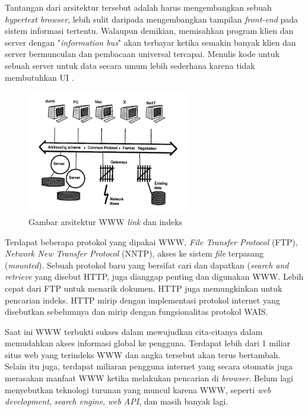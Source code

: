 Tantangan dari arsitektur tersebut adalah harus mengembangkan sebuah \textit{hypertext browser}, lebih sulit daripada mengembangkan tampilan \textit{front-end} pada sistem informasi tertentu. Walaupun demikian, memisahkan program klien dan server dengan "\textit{information bus}" akan terbayar ketika semakin banyak klien dan server bermunculan dan pembacaan universal tercapai. Menulis kode untuk sebuah server untuk data secara umum lebih sederhana karena tidak membutuhkan UI \citep{bernersLee1992}. 

\begin{figure}[H]
	\centering
	\includegraphics[keepaspectratio, width=7cm]{gambar/w3_architecture}
	\caption{Gambar arsitektur WWW \textit{link} dan indeks \citep{bernersLee1992}}
	\label{gambar:w3_architecture}
\end{figure}

Terdapat beberapa protokol yang dipakai WWW, \textit{File Transfer Protocol} (FTP), \textit{Network New Transfer Protocol} (NNTP), akses ke sistem \textit{file} terpasang (\textit{mounted}). Sebuah protokol baru yang bersifat cari dan dapatkan (\textit{search and retrieve} yang disebut HTTP, juga dianggap penting dan digunakan WWW. Lebih cepat dari FTP untuk menarik dokumen, HTTP juga memungkinkan untuk pencarian indeks. HTTP mirip dengan implementasi protokol internet yang disebutkan sebelumnya dan mirip dengan fungsionalitas protokol WAIS.

Saat ini WWW terbukti sukses dalam mewujudkan cita-citanya dalam memudahkan akses informasi global ke pengguna. Terdapat lebih dari 1 miliar situs web yang terindeks WWW \citep{huss2022} dan angka tersebut akan terus bertambah. Selain itu juga, terdapat miliaran pengguna internet yang secara otomatis juga merasakan manfaat WWW ketika melakukan pencarian di \textit{browser}. Belum lagi menyebutkan teknologi turunan yang muncul karena WWW, seperti \textit{web development}, \textit{search engine}, \textit{web API}, dan masih banyak lagi.


